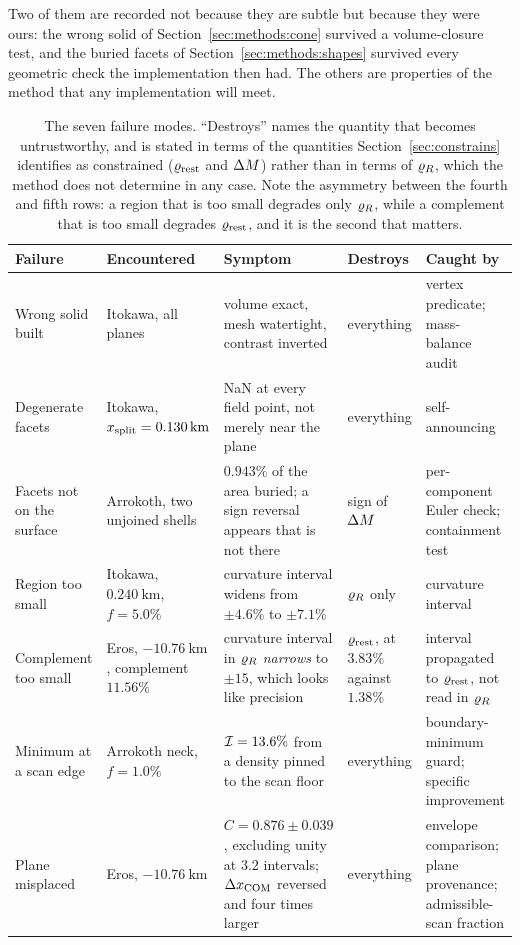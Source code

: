 Two of them are recorded not because they are subtle but because they were
ours: the wrong solid of Section~\ref{sec:methods:cone} survived a
volume-closure test, and the buried facets of
Section~\ref{sec:methods:shapes} survived every geometric check the
implementation then had. The others are properties of the method that any
implementation will meet.

\begin{table}[htbp]
\centering
\scriptsize
\setlength{\tabcolsep}{3.5pt}
\caption{The seven failure modes. ``Destroys'' names the quantity that
becomes untrustworthy, and is stated in terms of the quantities
Section~\ref{sec:constrains} identifies as constrained ($\varrho_{\mathrm{rest}}$ and
$\Delta M$) rather than in terms of $\varrho_{R}$, which the method does not
determine in any case. Note the asymmetry between the fourth and fifth
rows: a region that is too small degrades only $\varrho_{R}$, while a
complement that is too small degrades $\varrho_{\mathrm{rest}}$, and it is the second
that matters.}
\label{tab:failures}
\setlength{\tabcolsep}{5pt}
\small
\begin{tabular}{p{2.3cm}p{2.6cm}p{3.6cm}p{2.4cm}p{3.0cm}}
\toprule
Failure & Encountered & Symptom & Destroys & Caught by \\
\midrule
Wrong solid built
 & Itokawa, all planes
 & volume exact, mesh watertight, contrast inverted
 & everything
 & vertex predicate; mass-balance audit \\
\addlinespace
Degenerate facets
 & Itokawa, $x_{\mathrm{split}} = \SI{0.130}{\kilo\metre}$
 & NaN at every field point, not merely near the plane
 & everything
 & self-announcing \\
\addlinespace
Facets not on the surface
 & Arrokoth, two unjoined shells
 & $0.943\%$ of the area buried; a sign reversal appears that is not there
 & sign of $\Delta M$
 & per-component Euler check; containment test \\
\addlinespace
Region too small
 & Itokawa, $\SI{0.240}{\kilo\metre}$, $f = 5.0\%$
 & curvature interval widens from $\pm4.6\%$ to $\pm7.1\%$
 & $\varrho_{R}$ only
 & curvature interval \\
\addlinespace
Complement too small
 & Eros, $\SI{-10.76}{\kilo\metre}$, complement $11.56\%$
 & curvature interval in $\varrho_{R}$ \emph{narrows} to $\pm15$, which looks like precision
 & $\varrho_{\mathrm{rest}}$, at $3.83\%$ against $1.38\%$
 & interval propagated to $\varrho_{\mathrm{rest}}$, not read in $\varrho_{R}$ \\
\addlinespace
Minimum at a scan edge
 & Arrokoth neck, $f = 1.0\%$
 & $\mathcal{I} = 13.6\%$ from a density pinned to the scan floor
 & everything
 & boundary-minimum guard; specific improvement \\
\addlinespace
Plane misplaced
 & Eros, $\SI{-10.76}{\kilo\metre}$
 & $C = 0.876 \pm 0.039$, excluding unity at $3.2$ intervals; $\Delta x_{\mathrm{COM}}$ reversed and four times larger
 & everything
 & envelope comparison; plane provenance; admissible-scan fraction \\
\bottomrule
\end{tabular}
\end{table}

